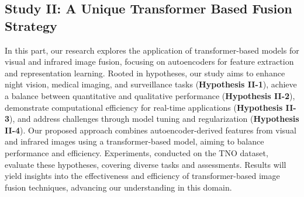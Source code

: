 \subsection{Study II: A Unique Transformer Based Fusion Strategy}\label{sec:study1}

In this part, our research explores the application of transformer-based models for visual and infrared image fusion, focusing on autoencoders for feature extraction and representation learning. Rooted in hypotheses, our study aims to enhance night vision, medical imaging, and surveillance tasks (\textbf{Hypothesis II-1}), achieve a balance between quantitative and qualitative performance (\textbf{Hypothesis II-2}), demonstrate computational efficiency for real-time applications (\textbf{Hypothesis II-3}), and address challenges through model tuning and regularization (\textbf{Hypothesis II-4}). Our proposed approach combines autoencoder-derived features from visual and infrared images using a transformer-based model, aiming to balance performance and efficiency. Experiments, conducted on the TNO dataset, evaluate these hypotheses, covering diverse tasks and assessments. Results will yield insights into the effectiveness and efficiency of transformer-based image fusion techniques, advancing our understanding in this domain.

